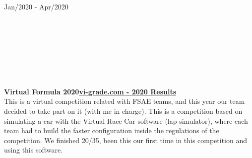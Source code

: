 \documentclass[10pt]{article}
\begin{document}
\begin{vwcol}[widths={0.235,0.765},
 sep=.8cm, rule=0pt,indent=0em,lines=8] 
\hspace{5pt}Jan/2020 - Apr/2020\par
    \hfill\\
    \hfill\\
    \hfill\\
    \hfill\\
    \hfill\\
    \hfill\\
    \hfill\\
    \textbf{Virtual Formula 2020}\hfill \href{https://www.vi-grade.com/en/about/virtual_formulas/virtual-formula-2020/?#virtualformula2020}{\color{blue!50!black}\textbf{vi-grade.com - 2020 Results}}\\
    \vspace{5pt}
    This is a virtual competition related with FSAE teams, and this year our team decided to take part on it (with me in charge). This is a competition based on simulating a car with the Virtual Race Car software (lap simulator), where each team had to build the faster configuration inside the regulations of the competition. We finished 20/35, been this our first time in this competition and using this software.\par
\end{vwcol}
\end{document}
